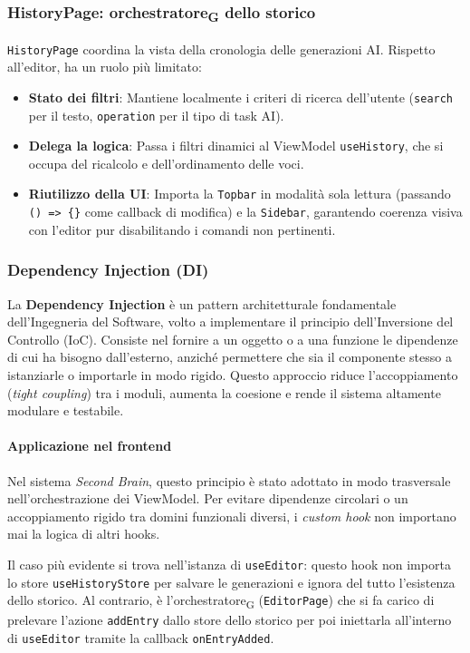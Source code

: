 \documentclass[11pt,a4paper]{article}
\newcommand{\gls}[1]{#1\textsubscript{G}}
\begin{document}
\subsubsection{HistoryPage: \gls{orchestratore} dello storico}
\texttt{HistoryPage} coordina la vista della cronologia delle generazioni AI. Rispetto all'editor, ha un ruolo più limitato:
\begin{itemize}
    \item \textbf{Stato dei filtri}: Mantiene localmente i criteri di ricerca dell'utente (\texttt{search} per il testo, \texttt{operation} per il tipo di task AI).
    \item \textbf{Delega la logica}: Passa i filtri dinamici al ViewModel \texttt{useHistory}, che si occupa del ricalcolo e dell'ordinamento delle voci.
    \item \textbf{Riutilizzo della UI}: Importa la \texttt{Topbar} in modalità sola lettura (passando \texttt{() => \{\}} come callback di modifica) e la \texttt{Sidebar}, garantendo coerenza visiva con l'editor pur disabilitando i comandi non pertinenti.
\end{itemize}


\subsubsection{Dependency Injection (DI)}
La \textbf{Dependency Injection} è un pattern architetturale fondamentale dell'Ingegneria del Software, volto a implementare il principio dell'Inversione del Controllo (IoC). Consiste nel fornire a un oggetto o a una funzione le dipendenze di cui ha bisogno dall'esterno, anziché permettere che sia il componente stesso a istanziarle o importarle in modo rigido. Questo approccio riduce l'accoppiamento (\textit{tight coupling}) tra i moduli, aumenta la coesione e rende il sistema altamente modulare e testabile.

\paragraph{Applicazione nel frontend}
Nel sistema \textit{Second Brain}, questo principio è stato adottato in modo trasversale nell'orchestrazione dei ViewModel. Per evitare dipendenze circolari o un accoppiamento rigido tra domini funzionali diversi, i \textit{custom hook} non importano mai la logica di altri hooks.

Il caso più evidente si trova nell'istanza di \texttt{useEditor}: questo hook non importa lo store \texttt{useHistoryStore} per salvare le generazioni e ignora del tutto l'esistenza dello storico. Al contrario, è l'\gls{orchestratore} (\texttt{EditorPage}) che si fa carico di prelevare l'azione \texttt{addEntry} dallo store dello storico per poi iniettarla all'interno di \texttt{useEditor} tramite la callback \texttt{onEntryAdded}.
\end{document}

